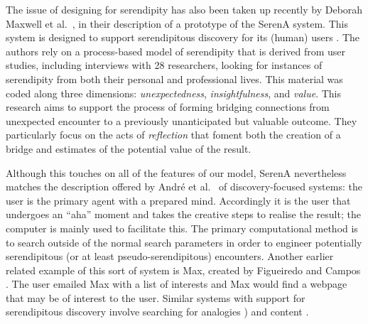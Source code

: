 The issue of designing for serendipity has also been taken up recently
by Deborah Maxwell et al.~\citeyear{maxwell2012designing}, in their
description of a prototype of the {\sf SerenA} system.  This system is
designed to support serendipitous discovery for its (human) users
\cite{forth2013serena}.  The authors rely on a process-based model of
serendipity \cite{Makri2012,Makri2012a} that is derived from user
studies, including interviews with 28 researchers, looking for
instances of serendipity from both their personal and professional
lives.  This material was coded along three dimensions:
\emph{unexpectedness}, \emph{insightfulness}, and \emph{value}.  This
research aims to support the process of forming bridging connections
from unexpected encounter to a previously unanticipated but valuable
outcome.  They particularly focus on the acts of \emph{reflection}
that foment both the creation of a bridge and estimates of the
potential value of the result.

Although this touches on all of the features of our model, {\sf
  SerenA} nevertheless matches the description offered by Andr{\'e} et
al.~\citeyear{andre2009discovery} of discovery-focused systems: the
user is the primary agent with a prepared mind.  Accordingly it is the
user that undergoes an ``aha'' moment and takes the creative steps to
realise the result; the computer is mainly used to facilitate this.
The primary computational method is to search outside of the normal
search parameters in order to engineer potentially serendipitous (or
at least pseudo-serendipitous) encounters.  Another earlier related
example of this sort of system is {\sf Max}, created by Figueiredo and
Campos \citeyear{Campos2002}.  The user emailed {\sf Max} with a list
of interests and {\sf Max} would find a webpage that may be of
interest to the user.  Similar systems with support for serendipitous
discovery involve searching for analogies
\cite{Donoghue2002,Donoghue2012}) and content \cite{Iaquinta2008}.

